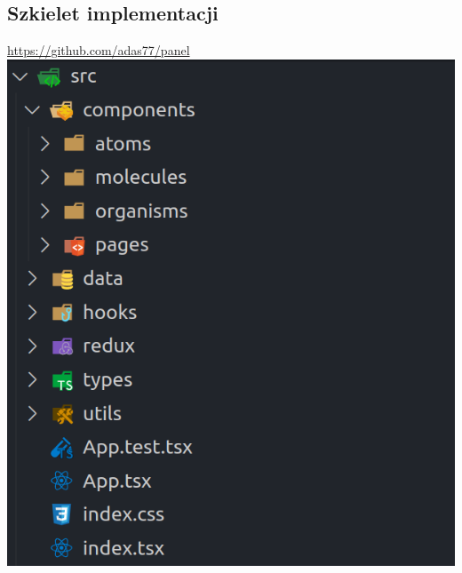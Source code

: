 \documentclass[a4paper,11pt]{article}
\begin{document}
\subsection{Szkielet implementacji}
\url{https://github.com/adas77/panel} \\
\includegraphics[scale=0.5]{src/s.png}

% 
\end{document}
